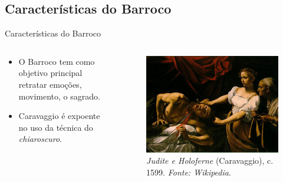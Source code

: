 \documentclass{beamer}
\begin{document}
\subsection{Características do Barroco}
\begin{frame}{Características do Barroco}
\begin{columns}
 \begin{column}{.49\textwidth}
 \begin{itemize}

\item<1> O Barroco tem como objetivo principal retratar emoções, movimento, o sagrado.

\item<2> Caravaggio é expoente no uso da técnica do
  \textit{chiaroscuro}.

\end{itemize}
 \end{column}

 \begin{column}{.49\textwidth}

\begin{figure}[h!]
  \begin{center}
    \includegraphics[width=1.0\textwidth]{figs/caravaggio_judite.png}
    \caption{\emph{Judite e Holoferne} (Caravaggio), c. 1599. \textit{Fonte: Wikipedia}.}
    \label{fig:caravaggio:judite}
\end{center}
\end{figure}

\end{column}
\end{columns}
\end{frame}
\end{document}
